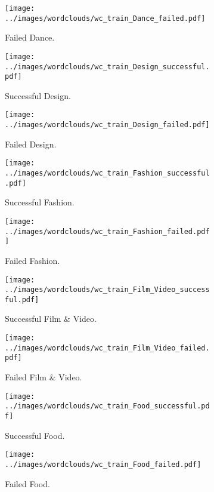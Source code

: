 \documentclass{article}
\begin{document}
\begin{itemize}
\begin{figure}
\begin{subfigure}[d']{0.2\linewidth}
    \centering\texttt{[image: ../images/wordclouds/wc\_train\_Dance\_failed.pdf]}
    \caption{Failed Dance.}
    \label{fig:Dance_f}
   \end{subfigure}
    \begin{subfigure}[e]{0.2\linewidth}
    \centering\texttt{[image: ../images/wordclouds/wc\_train\_Design\_successful.pdf]}
    \caption{Successful Design.}
    \label{fig:Design_s}
  \end{subfigure} 
  \begin{subfigure}[e']{0.2\linewidth}
    \centering\texttt{[image: ../images/wordclouds/wc\_train\_Design\_failed.pdf]}
    \caption{Failed Design.}
    \label{fig:Design_f}
  \end{subfigure} 
    \begin{subfigure}[f]{0.2\linewidth}
    \centering\texttt{[image: ../images/wordclouds/wc\_train\_Fashion\_successful.pdf]}
    \caption{Successful Fashion.}
    \label{fig:Fashion_s}
  \end{subfigure} 
  \begin{subfigure}[f']{0.2\linewidth}
    \centering\texttt{[image: ../images/wordclouds/wc\_train\_Fashion\_failed.pdf]}
    \caption{Failed Fashion.}
    \label{fig:Fashion_f}
  \end{subfigure}
    \begin{subfigure}[g]{0.2\linewidth}
    \centering\texttt{[image: ../images/wordclouds/wc\_train\_Film\_Video\_successful.pdf]}
    \caption{Successful Film \& Video.}
    \label{fig:Film_Video_s}
  \end{subfigure} 
  \begin{subfigure}[g']{0.2\linewidth}
    \centering\texttt{[image: ../images/wordclouds/wc\_train\_Film\_Video\_failed.pdf]}
    \caption{Failed Film \& Video.}
    \label{fig:Film_Video_f}
  \end{subfigure}
    \begin{subfigure}[h]{0.2\linewidth}
    \centering\texttt{[image: ../images/wordclouds/wc\_train\_Food\_successful.pdf]}
    \caption{Successful Food.}
    \label{fig:Food_s}
  \end{subfigure} 
  \begin{subfigure}[h']{0.2\linewidth}
    \centering\texttt{[image: ../images/wordclouds/wc\_train\_Food\_failed.pdf]}
    \caption{Failed Food.}
    \label{fig:Food_f}
  \end{subfigure}
    \begin{subfigure}[i]{0.2\linewidth}

\end{subfigure}
\end{figure}
\end{itemize}
\end{document}
